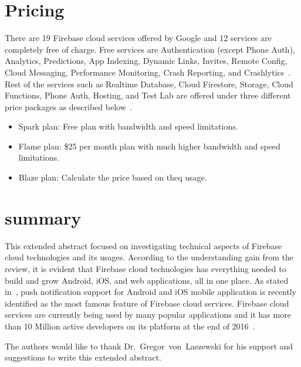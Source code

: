 \section{Pricing} 

There are 19 Firebase cloud services offered by Google and 12 services
are completely free of charge. Free services are Authentication
(except Phone Auth), Analytics, Predictions, App Indexing, Dynamic
Links, Invites, Remote Config, Cloud Messaging, Performance
Monitoring, Crash Reporting, and
Crashlytics~\cite{hid-sp18-409-www-firebase-pricing}. Rest of the
services such as Realtime Database, Cloud Firestore, Storage, Cloud
Functions, Phone Auth, Hosting, and Test Lab are offered under three
different price packages as described
below~\cite{hid-sp18-409-www-firebase-pricing}.

\begin{itemize} 

\item Spark plan: Free plan with bandwidth and speed
	limitations. 

\item Flame plan: \$25 per month plan with much higher 
	bandwidth
	and speed limitations. 

\item Blaze plan: Calculate the price based on theq
  usage. 

\end{itemize}

\section{summary} This extended abstract focused on investigating
technical aspects of Firebase cloud technologies and its
usages. According to the understanding gain from the review, it is
evident that Firebase cloud technologies has everything needed to
build and grow Android, iOS, and web applications, all in one place.
As stated in~\cite{hid-sp18-409-www-firebase}, push notification
support for Android and iOS mobile application is recently identified
as the most famous feature of Firebase cloud services. Firebase cloud
services are currently being used by many popular applications and it
has more than 10 Million active developers on its platform at the end
of 2016~\cite{hid-sp18-409-www-firebase}.

\begin{acks}
	
	The authors would like to thank Dr.~Gregor~von~Laszewski for his
  support and suggestions to write this extended abstract.
	
\end{acks}


 

